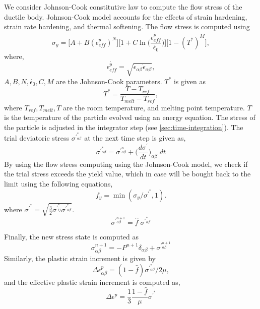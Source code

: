 We consider Johnson-Cook constitutive law to compute the flow stress of the
ductile body. Johnson-Cook model accounts for the effects of strain hardening,
strain rate hardening, and thermal softening. The flow stress is computed using
\begin{equation}
  \sigma_y = \bigg[A + B (\epsilon^{p}_{eff})^N \bigg]
  \bigg[1 + C \ln\bigg(\frac{\dot{\epsilon^{p}_{eff}}}{\dot{\epsilon_0}}\bigg) \bigg] \bigg[1 - (T^*)^M \bigg],
\end{equation}
where,
\begin{equation}
  \dot{\epsilon^{p}_{eff}} = \sqrt{\dot{\epsilon}_{\alpha \beta} \dot{\epsilon}_{\alpha \beta}},
\end{equation}
$A, B, N, \dot{\epsilon_{0}}, C, M$ are the Johnson-Cook parameters. $T^*$ is given as
\begin{equation}
  T^* = \frac{T - T_{ref}}{T_{melt} - T_{ref}},
\end{equation}
where $T_{ref}, T_{melt}, T$ are the room temperature, and melting point
temperature. $T$ is the temperature of the particle evolved using an energy
equation. The stress of the particle is adjusted in the integrator step (see
\cref{sec:time-integration}). The trial deviatoric stress $\sigma^{'}^{*}_{\alpha \beta}$
at the next time step is given as,
\begin{equation}
  \sigma^{'}^{*}_{\alpha \beta} = \sigma^{'}^{n}_{\alpha \beta} + \bigg( \frac{d\sigma^{'}}{dt}\bigg)_{\alpha \beta}  \; dt
\end{equation}
By using the flow stress computing using the Johnson-Cook model, we check if
the trial stress exceeds the yield value, which in case will be bought back to
the limit using the following equations,
\begin{equation}
  f_y = \min{(\sigma_y / \sigma^{'}^*, 1)}.
\end{equation}
where $\sigma^{'}^* = \sqrt{\frac{3}{2} \sigma^{'}^*_{ij} \sigma^{'}^*_{\alpha \beta}}$.
\begin{equation}
  \sigma^{'}^{n+1}_{\alpha \beta} = \hat{f} \; \sigma^{'}^{*}_{\alpha \beta}
\end{equation}

Finally, the new stress state is computed as
\begin{equation}
  \sigma^{n+1}_{\alpha \beta} = - P^{n+1}\delta_{\alpha \beta} + \sigma^{'}^{n+1}_{\alpha \beta}
\end{equation}
Similarly, the plastic strain increment is given by
\begin{equation}
  \Delta \epsilon^{p}_{\alpha \beta} = (1 - \hat{f}) \sigma^{'}^{*}_{\alpha \beta} / 2 \mu,
\end{equation}
and the effective plastic strain increment is computed as,
\begin{equation}
  \Delta \epsilon^{p} = \frac{1}{3} \frac{1 - \hat{f}}{\mu}\sigma^{'}^{*}
\end{equation}


